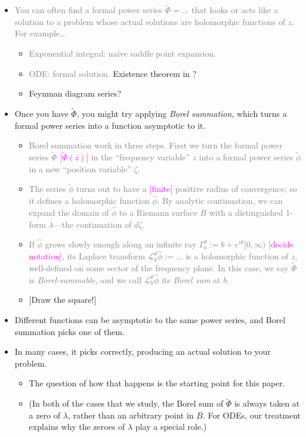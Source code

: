 \documentclass{article}
\newcommand{\done}[1]{\textcolor{gray}{#1}}
\newcommand{\laplace}{\mathcal{L}}
\begin{document}
\begin{itemize}
\item \done{You can often find a formal power series $\tilde{\Phi} = \ldots$ that looks or acts like a solution to a problem whose actual solutions are holomorphic functions of $z$. For example\ldots}
\begin{itemize}
\item \done{Exponential integral: na\"{i}ve saddle point expansion.}
\item \done{ODE: formal solution.} Existence theorem in \cite{diverg-resurg-iii}?
\item Feynman diagram series?
\end{itemize}
\item Once you have $\tilde{\Phi}$, you might try applying {\em Borel summation}, which turns a formal power series into a function asymptotic to it.
\begin{itemize}
\item \done{Borel summation work in three steps. First we turn the formal power series $\tilde{\Phi}$ \textcolor{magenta}{[$\tilde{\Phi}(z)$]} in the ``frequency variable'' $z$ into a formal power series $\tilde{\phi}$ in a new ``position variable'' $\zeta$.}
\item \done{The series $\tilde{\phi}$ turns out to have a \textcolor{magenta}{[finite]} positive radius of convergence, so it defines a holomorphic function $\hat{\phi}$. By analytic continuation, we can expand the domain of $\hat{\phi}$ to a Riemann surface $B$ with a distinguished 1-form $\lambda$---the continuation of $d\zeta$.}
\item \done{If $\hat{\phi}$ grows slowly enough along an infinite ray $\Gamma_b^\theta := b + e^{i\theta}[0, \infty)$ \textcolor{magenta}{[decide notation]}, its Laplace transform $\laplace_b^\theta \hat{\phi} := \ldots$ is a holomorphic function of $z$, well-defined on some sector of the frequency plane. In this case, we say $\tilde{\Phi}$ is {\em Borel-summable}, and we call $\laplace_b^\theta \hat{\phi}$ its {\em Borel sum} at $b$.}
\item {[Draw the square!]}
\end{itemize}
\item Different functions can be asymptotic to the same power series, and Borel summation picks one of them.
\item In many cases, it picks correctly, producing an actual solution to your problem.
\begin{itemize}
\item The question of how that happens is the starting point for this paper.
\item (In both of the cases that we study, the Borel sum of $\tilde{\Phi}$ is always taken at a zero of $\lambda$, rather than an arbitrary point in $B$. For ODEs, our treatment explains why the zeroes of $\lambda$ play a special role.)
\end{itemize}
\end{itemize}
\end{document}
